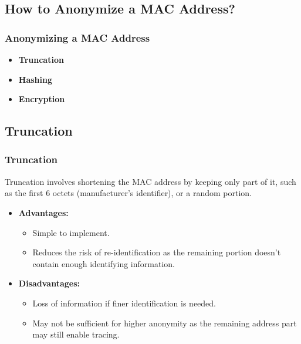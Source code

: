 \documentclass[
english,
svgnames,
notes=hide,
12pt]{beamer}
\begin{document}
\begin{frame}
  \section{How to Anonymize a MAC Address?}
  \frametitle{Anonymizing a MAC Address}
  \begin{itemize}
    \item \textbf{Truncation} \pause
    \item \textbf{Hashing} \pause
    \item \textbf{Encryption} 
  \end{itemize}
\end{frame}

\begin{frame}
  \section{Truncation}
  \frametitle{Truncation}
  Truncation involves shortening the MAC address by keeping only part of it, such as the first 6 octets (manufacturer's identifier), or a random portion.
  \begin{itemize}
    \item \textbf{Advantages:} \pause
      \begin{itemize}
        \item Simple to implement. \pause
        \item Reduces the risk of re-identification as the remaining portion doesn't contain enough identifying information. \pause
      \end{itemize}
    \item \textbf{Disadvantages:} \pause
      \begin{itemize}
        \item Loss of information if finer identification is needed. \pause
        \item May not be sufficient for higher anonymity as the remaining address part may still enable tracing. 
      \end{itemize}
  \end{itemize}
\end{frame}
\end{document}
